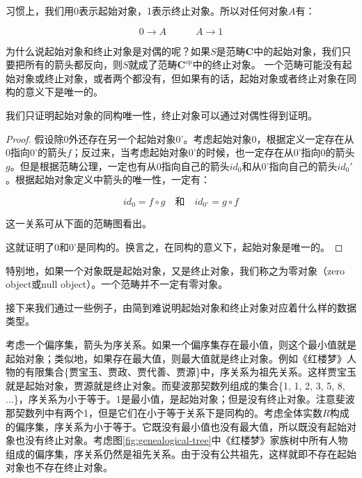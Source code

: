\documentclass{article}
\begin{document}
习惯上，我们用0表示起始对象，1表示终止对象。所以对任何对象$A$有：

\[
  0 \longrightarrow A \quad \quad \quad A \longrightarrow 1
\]

为什么说起始对象和终止对象是对偶的呢？如果$S$是范畴$\pmb{C}$中的起始对象，我们只要把所有的箭头都反向，则$S$就成了范畴$\pmb{C}^{op}$中的终止对象。
一个范畴可能没有起始对象或终止对象，或者两个都没有，但如果有的话，起始对象或者终止对象在同构的意义下是唯一的。

我们只证明起始对象的同构唯一性，终止对象可以通过对偶性得到证明。

\begin{proof}
假设除0外还存在另一个起始对象0'。考虑起始对象0，根据定义一定存在从0指向0'的箭头$f$；反过来，当考虑起始对象0'的时候，也一定存在从0'指向0的箭头$g$。但是根据范畴公理，一定也有从0指向自己的箭头$id_0$和从0'指向自己的箭头$id_0'$。根据起始对象定义中箭头的唯一性，一定有：

\[
  id_0 = f \circ g \quad \text{和} \quad id_{0'} = g \circ f
\]

这一关系可从下面的范畴图看出。

\begin{center}
\end{center}

这就证明了0和0'是同构的。换言之，在同构的意义下，起始对象是唯一的。
\end{proof}

特别地，如果一个对象既是起始对象，又是终止对象，我们称之为零对象（zero object或null object）。一个范畴并不一定有零对象。

接下来我们通过一些例子，由简到难说明起始对象和终止对象对应着什么样的数据类型。

\begin{example}
考虑一个偏序集，箭头为序关系。如果一个偏序集存在最小值，则这个最小值就是起始对象；类似地，如果存在最大值，则最大值就是终止对象。例如《红楼梦》人物的有限集合\{贾宝玉、贾政、贾代善、贾源\}中，序关系为祖先关系。这样贾宝玉就是起始对象，贾源就是终止对象。而斐波那契数列组成的集合\{1, 1, 2, 3, 5, 8, ...\}，序关系为小于等于。1是最小值，是起始对象；但是没有终止对象。注意斐波那契数列中有两个1，但是它们在小于等于关系下是同构的。考虑全体实数$R$构成的偏序集，序关系为小于等于。它既没有最小值也没有最大值，所以既没有起始对象也没有终止对象。考虑图\ref{fig:genealogical-tree}中《红楼梦》家族树中所有人物组成的偏序集，序关系仍然是祖先关系。由于没有公共祖先，这样就即不存在起始对象也不存在终止对象。
\end{example}
\end{document}
